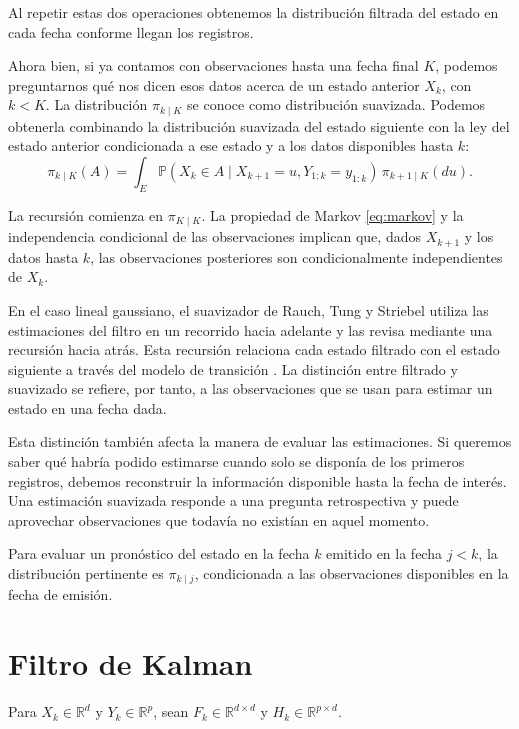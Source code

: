 Al repetir estas dos operaciones obtenemos la distribución filtrada del estado en cada fecha conforme llegan los registros.

Ahora bien, si ya contamos con observaciones hasta una fecha final $K$, podemos preguntarnos qué nos dicen esos datos acerca de un estado anterior $X_k$, con $k<K$. La distribución $\pi_{k\mid K}$ se conoce como distribución suavizada. Podemos obtenerla combinando la distribución suavizada del estado siguiente con la ley del estado anterior condicionada a ese estado y a los datos disponibles hasta $k$:
\begin{equation}
    \pi_{k\mid K}(A)=\int_E
        \mathbb P(X_k\in A\mid X_{k+1}=u,Y_{1:k}=y_{1:k})
        \,\pi_{k+1\mid K}(du).
\end{equation}


La recursión comienza en $\pi_{K\mid K}$. La propiedad de Markov \eqref{eq:markov} y la independencia condicional de las observaciones implican que, dados $X_{k+1}$ y los datos hasta $k$, las observaciones posteriores son condicionalmente independientes de $X_k$.

En el caso lineal gaussiano, el suavizador de Rauch, Tung y Striebel utiliza las estimaciones del filtro en un recorrido hacia adelante y las revisa mediante una recursión hacia atrás. Esta recursión relaciona cada estado filtrado con el estado siguiente a través del modelo de transición \cite{rauch1965}\label{cita:rauch1965}. La distinción entre filtrado y suavizado se refiere, por tanto, a las observaciones que se usan para estimar un estado en una fecha dada.

Esta distinción también afecta la manera de evaluar las estimaciones. Si queremos saber qué habría podido estimarse cuando solo se disponía de los primeros registros, debemos reconstruir la información disponible hasta la fecha de interés. Una estimación suavizada responde a una pregunta retrospectiva y puede aprovechar observaciones que todavía no existían en aquel momento.

Para evaluar un pronóstico del estado en la fecha $k$ emitido en la fecha $j<k$, la distribución pertinente es $\pi_{k\mid j}$, condicionada a las observaciones disponibles en la fecha de emisión.


\section{Filtro de Kalman}
\label{sec:kalman}


Para $X_k\in\mathbb R^d$ y $Y_k\in\mathbb R^p$, sean $F_k\in\mathbb R^{d\times d}$ y $H_k\in\mathbb R^{p\times d}$.

